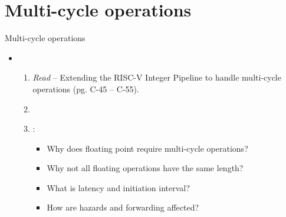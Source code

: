 \section{Multi-cycle operations}

\begin{frame}[t]{Multi-cycle operations}
\begin{itemize}
  \item {}
    \begin{enumerate}
      \item \emph{Read}  -- Extending the RISC-V Integer Pipeline
            to handle multi-cycle operations (pg. C-45 -- C-55).
        \item \bibhennessy

      \item {}:
        \begin{itemize}
          \item Why does floating point require multi-cycle operations?
          \item Why not all floating operations have the same length?
          \item What is latency and initiation interval?
          \item How are hazards and forwarding affected?
        \end{itemize}
    \end{enumerate}
\end{itemize}
\end{frame}

